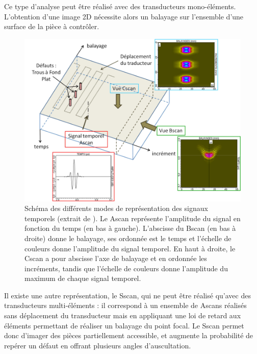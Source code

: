 Ce type d'analyse peut être réalisé avec des transducteurs mono-éléments. L'obtention d'une image 2D nécessite alors un balayage sur l'ensemble d'une surface de la pièce à contrôler. \\


\begin{figure}
	\centering
	\includegraphics[scale=0.7]{img/scan2.png}
	\caption{\label{scan} Schéma des différents modes de représentation des signaux temporels (extrait de \cite{bannouf}). Le Ascan représente l'amplitude du signal en fonction du temps (en bas à gauche). L'abscisse du Bscan (en bas à droite) donne le balayage, ses ordonnée est le temps et l'échelle de couleurs donne l'amplitude du signal temporel. En haut à droite, le Cscan a pour abscisse l'axe de balayage et en ordonnée les incréments, tandis que l'échelle de couleurs donne l'amplitude du maximum de chaque signal temporel.}
\end{figure}

Il existe une autre représentation, le Sscan, qui ne peut être réalisé qu'avec des transducteurs multi-éléments : il correspond à un ensemble de Ascans réalisés sans déplacement du transducteur mais en appliquant une loi de retard aux éléments permettant de réaliser un balayage du point focal. Le Sscan permet donc d'imager des pièces partiellement accessible, et augmente la probabilité de repérer un défaut en offrant plusieurs angles d'auscultation.\\

